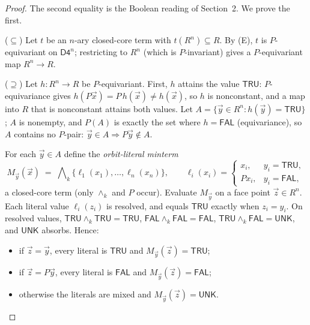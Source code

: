 \documentclass[11pt]{article}
\theoremstyle{remark}
\newcommand{\Dfour}{\ensuremath{\mathsf{D4}}}
\newcommand{\UNK}{\ensuremath{\mathsf{UNK}}}
\newcommand{\FAL}{\ensuremath{\mathsf{FAL}}}
\newcommand{\TRU}{\ensuremath{\mathsf{TRU}}}
\newcommand{\meetk}{\ensuremath{\wedge_k}}
\begin{document}
\begin{proof}
The second equality is the Boolean reading of Section~2. We prove the
first.

($\subseteq$) Let $t$ be an $n$-ary closed-core term with
$t(R^n)\subseteq R$. By (E), $t$ is $P$-equivariant on $\Dfour^n$;
restricting to $R^n$ (which is $P$-invariant) gives a $P$-equivariant map
$R^n\to R$.

($\supseteq$) Let $h:R^n\to R$ be $P$-equivariant. First, $h$ attains
the value \TRU: $P$-equivariance gives $h(P\vec x)=P\,h(\vec x)\ne
h(\vec x)$, so $h$ is nonconstant, and a map into $R$ that is nonconstant
attains both values. Let $A=\{\vec y\in R^n : h(\vec y)=\TRU\}$; $A$ is
nonempty, and $P(A)$ is exactly the set where $h=\FAL$ (equivariance), so
$A$ contains no $P$-pair: $\vec y\in A \Rightarrow P\vec y\notin A$.

For each $\vec y\in A$ define the \emph{orbit-literal minterm}
\[
M_{\vec y}(\vec x) \;=\; \bigwedge\nolimits_k \{\ell_1(x_1),\dots,
\ell_n(x_n)\},
\qquad
\ell_i(x_i)=
\begin{cases}
x_i, & y_i=\TRU,\\
P x_i, & y_i=\FAL,
\end{cases}
\]
a closed-core term (only $\meetk$ and $P$ occur). Evaluate $M_{\vec y}$
on a face point $\vec z\in R^n$. Each literal value $\ell_i(z_i)$ is
resolved, and equals \TRU{} exactly when $z_i=y_i$. On resolved values,
$\TRU\meetk\TRU=\TRU$, $\FAL\meetk\FAL=\FAL$, $\TRU\meetk\FAL=\UNK$, and
\UNK{} absorbs. Hence:
\begin{itemize}
\item if $\vec z=\vec y$, every literal is \TRU{} and
  $M_{\vec y}(\vec z)=\TRU$;
\item if $\vec z=P\vec y$, every literal is \FAL{} and
  $M_{\vec y}(\vec z)=\FAL$;
\item otherwise the literals are mixed and $M_{\vec y}(\vec z)=\UNK$.
\end{itemize}


\end{proof}
\end{document}
